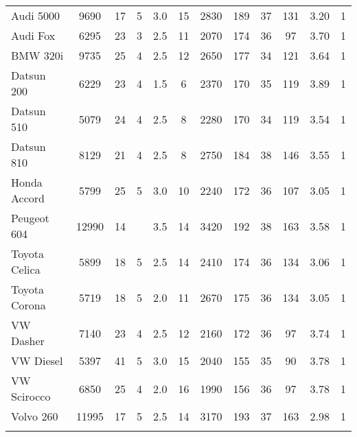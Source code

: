 \documentclass{article}
\begin{document}
\begin{table}[tbp]
{\begin{tabularx}{\linewidth}{@{}lCCCCCCCCCCC@{}}
Audi 5000&9690&17&5&3.0&15&2830&189&37&131&3.20&1 \tabularnewline \addlinespace[0.1cm]
Audi Fox&6295&23&3&2.5&11&2070&174&36&97&3.70&1 \tabularnewline \addlinespace[0.1cm]
BMW 320i&9735&25&4&2.5&12&2650&177&34&121&3.64&1 \tabularnewline \addlinespace[0.1cm]
Datsun 200&6229&23&4&1.5&6&2370&170&35&119&3.89&1 \tabularnewline \addlinespace[0.1cm]
Datsun 510&5079&24&4&2.5&8&2280&170&34&119&3.54&1 \tabularnewline \addlinespace[0.1cm]
Datsun 810&8129&21&4&2.5&8&2750&184&38&146&3.55&1 \tabularnewline \addlinespace[0.1cm]
Honda Accord&5799&25&5&3.0&10&2240&172&36&107&3.05&1 \tabularnewline \addlinespace[0.1cm]
Peugeot 604&12990&14&&3.5&14&3420&192&38&163&3.58&1 \tabularnewline \addlinespace[0.1cm]
Toyota Celica&5899&18&5&2.5&14&2410&174&36&134&3.06&1 \tabularnewline \addlinespace[0.1cm]
Toyota Corona&5719&18&5&2.0&11&2670&175&36&134&3.05&1 \tabularnewline \addlinespace[0.1cm]
VW Dasher&7140&23&4&2.5&12&2160&172&36&97&3.74&1 \tabularnewline \addlinespace[0.1cm]
VW Diesel&5397&41&5&3.0&15&2040&155&35&90&3.78&1 \tabularnewline \addlinespace[0.1cm]
VW Scirocco&6850&25&4&2.0&16&1990&156&36&97&3.78&1 \tabularnewline \addlinespace[0.1cm]
Volvo 260&11995&17&5&2.5&14&3170&193&37&163&2.98&1 \tabularnewline \addlinespace[0.1cm]
\bottomrule 

\end{tabularx}
}
\end{table}
\end{document}
